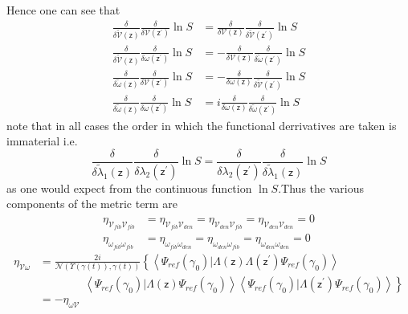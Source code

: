 \documentclass[aps,preprint]{revtex4}%
\begin{document}
Hence one can see that
\begin{align}
\frac{\delta}{\delta\mathcal{\tilde{V}}(\mathsf{z})}\frac{\delta}%
{\delta\mathcal{V}(\mathsf{z}^{\prime})}\ln S  &  =\frac{\delta}%
{\delta\mathcal{V}(\mathsf{z})}\frac{\delta}{\delta\mathcal{\tilde{V}%
}(\mathsf{z}^{\prime})}\ln S\\
\frac{\delta}{\delta\mathcal{\tilde{V}}(\mathsf{z})}\frac{\delta}%
{\delta\mathcal{\omega}(\mathsf{z}^{\prime})}\ln S  &  =-\frac{\delta}%
{\delta\mathcal{V}(\mathsf{z})}\frac{\delta}{\delta\mathcal{\tilde{\omega}%
}(\mathsf{z}^{\prime})}\ln S\\
\frac{\delta}{\delta\mathcal{\tilde{\omega}}(\mathsf{z})}\frac{\delta}%
{\delta\mathcal{V}(\mathsf{z}^{\prime})}\ln S  &  =-\frac{\delta}{\delta
\omega(\mathsf{z})}\frac{\delta}{\delta\mathcal{\tilde{V}}(\mathsf{z}^{\prime
})}\ln S\\
\frac{\delta}{\delta\mathcal{\tilde{\omega}}(\mathsf{z})}\frac{\delta}%
{\delta\omega(\mathsf{z}^{\prime})}\ln S  &  =i\frac{\delta}{\delta
\omega(\mathsf{z})}\frac{\delta}{\delta\mathcal{\tilde{\omega}}(\mathsf{z}%
^{\prime})}\ln S
\end{align}
note that in all cases the order in which the functional derrivatives are
taken is immaterial i.e.%
\begin{equation}
\frac{\delta}{\delta\tilde{\lambda}_{1}(\mathsf{z})}\frac{\delta}%
{\delta\lambda_{2}(\mathsf{z}^{\prime})}\ln S=\frac{\delta}{\delta\lambda
_{2}(\mathsf{z}^{\prime})}\frac{\delta}{\delta\tilde{\lambda}_{1}(\mathsf{z}%
)}\ln S
\end{equation}
as one would expect from the continuous function $\ln S.$Thus the various
components of the metric term are
\begin{align}
\eta_{\mathcal{V}_{fib}\mathcal{V}_{fib}}  &  =\eta_{\mathcal{V}%
_{fib}\mathcal{V}_{den}}=\eta_{\mathcal{V}_{den}\mathcal{V}_{fib}}%
=\eta_{\mathcal{V}_{den}\mathcal{V}_{den}}=0\\
\eta_{\mathcal{\omega}_{fib}\mathcal{\omega}_{fib}}  &  =\eta_{\mathcal{\omega
}_{fib}\mathcal{\omega}_{den}}=\eta_{\mathcal{\omega}_{den}\mathcal{\omega
}_{fib}}=\eta_{\mathcal{\omega}_{den}\mathcal{\omega}_{den}}=0
\end{align}%
\begin{align}
\eta_{\mathcal{V\omega}}  &  =\frac{2i}{\mathcal{N}\left(  \Upsilon\left(
\gamma\left(  t\right)  \right)  ,\gamma\left(  t\right)  \right)  }\left\{
\left\langle \Psi_{ref}\left(  \gamma_{0}\right)  |\Lambda\left(
\mathsf{z}\right)  \Lambda\left(  \mathsf{z}^{\prime}\right)  \Psi
_{ref}\left(  \gamma_{0}\right)  \right\rangle \right. \nonumber\\
&  \qquad\qquad\left.  \left\langle \Psi_{ref}\left(  \gamma_{0}\right)
|\Lambda\left(  \mathsf{z}\right)  \Psi_{ref}\left(  \gamma_{0}\right)
\right\rangle \left\langle \Psi_{ref}\left(  \gamma_{0}\right)  |\Lambda
\left(  \mathsf{z}^{\prime}\right)  \Psi_{ref}\left(  \gamma_{0}\right)
\right\rangle \right\} \nonumber\\
&  =-\eta_{\omega\mathcal{V}} \label{vomega}%
\end{align}
\end{document}
